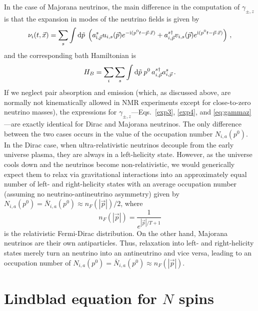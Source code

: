 \documentclass[aps,prd,10pt,twocolumn,superscriptaddress,floatfix,nofootinbib,amsmath,amssymb,altaffilletter,preprintnumbers]{revtex4-1}
\begin{document}
In the case of Majorana neutrinos, the main difference in the computation of $\gamma_{\pm,z}$ is that the expansion in modes of the neutrino fields is given by
\begin{equation}
    \nu_i(t,\vec{x})= \sum_s \int {\rm d}\tilde{p} \; \left(a^s_{{\rm i},\vec{p}}u_{i,s}(\vec{p})e^{-{\rm i}(p^0t-\vec{p}\cdot\vec{x})}+a^{s \dag}_{i,\vec{p}}v_{i,s}(\vec{p})e^{{\rm i}(p^0t-\vec{p}\cdot\vec{x})}\right)\, ,
\end{equation}
and the corresponding bath Hamiltonian is
\begin{equation}
    H_B= \sum_i \sum_s \int {\rm d} \tilde{p}\; p^0\, a^{s \dag}_{i,\vec{p}} a^s_{i,\vec{p}}\, .
\end{equation}
If we neglect pair absorption and emission (which, as discussed above, are normally not kinematically allowed in NMR experiments except for close-to-zero neutrino masses), the expressions for $\gamma_{\pm,z}$---Eqs.~\eqref{exp3}, \eqref{exp4}, and \eqref{eq:gammaz}---are exactly identical for  Dirac and Majorana neutrinos. The only difference between the two cases occurs in the value of the occupation number $N_{i,a}(p^0)$.  In the Dirac case, when ultra-relativistic neutrinos decouple from the early universe plasma, they are always in a left-helicity state. However, as the universe cools down and the neutrinos become non-relativistic, we would generically expect them to relax via gravitational interactions into an approximately equal number of left- and right-helicity states with an average occupation number (assuming no neutrino-antineutrino asymmetry)  given by
$N_{i,a} (p^0) = \bar{N}_{i,a}(p^0)\approx n_F(|\vec{p}|)/2$, where 
\begin{equation}
    n_F(|\vec{p}|)= \frac{1}{e^{|\vec{p}|/T+1}}
\end{equation}
is the relativistic Fermi-Dirac distribution.
On the other hand, Majorana neutrinos are their own antiparticles. Thus, relaxation into left- and right-helicity states merely turn an neutrino into an antineutrino and vice versa, 
leading to an occupation number of $N_{i,a} (p^0) = \bar{N}_{i,a}(p^0)\approx n_F(|\vec{p}|)$.





    
\section{Lindblad equation for \texorpdfstring{$N$}{N} spins}
\label{app:lindn}
\end{document}
